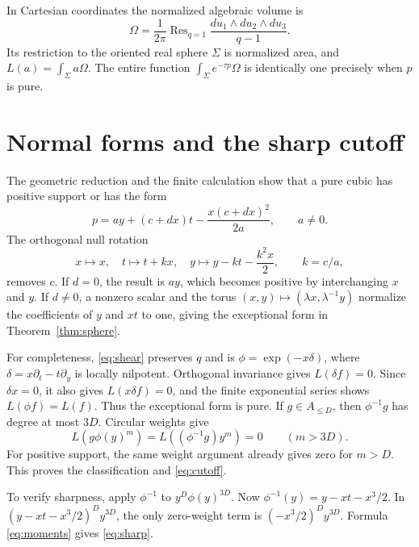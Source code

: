 \documentclass[11pt]{article}
\DeclareMathOperator{\Res}{Res}
\theoremstyle{remark}\newtheorem{remark}[theorem]{Remark}
\begin{document}
In Cartesian coordinates the normalized algebraic volume is
\[
 \Omega=\frac1{2\pi}\Res_{q=1}
 \frac{du_1\wedge du_2\wedge du_3}{q-1}.
\]
Its restriction to the oriented real sphere \(\Sigma\) is normalized
area, and \(L(a)=\int_\Sigma a\Omega\). The entire function
\(\int_\Sigma e^{-\tau p}\Omega\) is identically one precisely when
\(p\) is pure.




\section{Normal forms and the sharp cutoff}\label{sec:normal-forms}

The geometric reduction and the finite calculation show that a pure
cubic has positive support or has the form
\begin{equation}\label{eq:family}
 p=ay+(c+dx)t-\frac{x(c+dx)^2}{2a},\qquad a\ne0.
\end{equation}
The orthogonal null rotation
\[
 x\mapsto x,\quad t\mapsto t+kx,\quad
 y\mapsto y-kt-\frac{k^2x}{2},\qquad k=c/a,
\]
removes \(c\). If \(d=0\), the result is \(ay\), which becomes
positive by interchanging \(x\) and \(y\). If \(d\ne0\), a nonzero
scalar and the torus \((x,y)\mapsto(\lambda x,\lambda^{-1}y)\)
normalize the coefficients of \(y\) and \(xt\) to one, giving the
exceptional form in Theorem~\ref{thm:sphere}.

For completeness, \eqref{eq:shear} preserves \(q\) and is
\(\phi=\exp(-x\delta)\), where
\(\delta=x\partial_t-t\partial_y\) is locally nilpotent.
Orthogonal invariance gives \(L(\delta f)=0\). Since \(\delta x=0\),
it also gives \(L(x\delta f)=0\), and the finite exponential series
shows \(L(\phi f)=L(f)\). Thus the exceptional form is pure.
If \(g\in A_{\leq D}\), then \(\phi^{-1}g\) has degree at most
\(3D\). Circular weights give
\[
 L(g\phi(y)^m)=L((\phi^{-1}g)y^m)=0\qquad(m>3D).
\]
For positive support, the same weight argument already gives zero for
\(m>D\). This proves the classification and \eqref{eq:cutoff}.

To verify sharpness, apply \(\phi^{-1}\) to \(y^D\phi(y)^{3D}\).
Now \(\phi^{-1}(y)=y-xt-x^3/2\). In
\((y-xt-x^3/2)^D y^{3D}\), the only zero-weight term is
\((-x^3/2)^D y^{3D}\). Formula \eqref{eq:moments} gives
\eqref{eq:sharp}.
\end{document}
